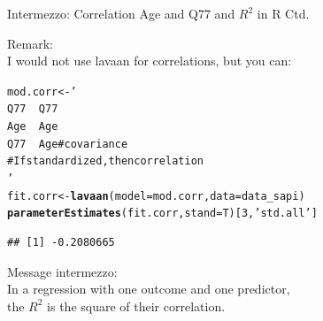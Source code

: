 \documentclass[10pt]{beamer}\usepackage[]{graphicx}\usepackage[]{xcolor}
\makeatletter
\newcommand{\hlnum}[1]{\textcolor[rgb]{0.686,0.059,0.569}{#1}}%
\newcommand{\hlstr}[1]{\textcolor[rgb]{0.192,0.494,0.8}{#1}}%
\newcommand{\hlstd}[1]{\textcolor[rgb]{0.345,0.345,0.345}{#1}}%
\newcommand{\hlkwb}[1]{\textcolor[rgb]{0.69,0.353,0.396}{#1}}%
\newcommand{\hlkwc}[1]{\textcolor[rgb]{0.333,0.667,0.333}{#1}}%
\newcommand{\hlkwd}[1]{\textcolor[rgb]{0.737,0.353,0.396}{\textbf{#1}}}%
\newenvironment{kframe}{%
 \def\at@end@of@kframe{}%
 \ifinner\ifhmode%
  \def\at@end@of@kframe{\end{minipage}}%
  \begin{minipage}{\columnwidth}%
 \fi\fi%
 \def\FrameCommand##1{\hskip\@totalleftmargin \hskip-\fboxsep
 \colorbox{shadecolor}{##1}\hskip-\fboxsep
     \hskip-\linewidth \hskip-\@totalleftmargin \hskip\columnwidth}%
 \MakeFramed {\advance\hsize-\width
   \@totalleftmargin\z@ \linewidth\hsize
   \@setminipage}}%
 {\par\unskip\endMakeFramed%
 \at@end@of@kframe}
\newenvironment{knitrout}{}{} %
\makeatother
\begin{document}
\begin{frame}[fragile]{Intermezzo: Correlation Age and Q77 and $R^2$ in R Ctd.}

Remark:\\
I would not use lavaan for correlations, but you can:
\begin{knitrout}
\color{fgcolor}\begin{kframe}
\begin{alltt}
\hlstd{mod.corr} \hlkwb{<-} \hlstr{'
  Q77 ~~ Q77
  Age ~~ Age
  Q77 ~~ Age # covariance
  # If standardized, then correlation
'}
\hlstd{fit.corr} \hlkwb{<-} \hlkwd{lavaan}\hlstd{(}\hlkwc{model} \hlstd{= mod.corr,} \hlkwc{data} \hlstd{= data_sapi)}
\hlkwd{parameterEstimates}\hlstd{(fit.corr,} \hlkwc{stand}\hlstd{=T)[}\hlnum{3}\hlstd{,}\hlstr{'std.all'}\hlstd{]}
\end{alltt}
\begin{verbatim}
## [1] -0.2080665
\end{verbatim}
\end{kframe}
\end{knitrout}

Message intermezzo:\\
In a regression with one outcome and one predictor,\\
the $R^2$ is the square of their correlation.
\end{frame}
%
\end{document}
